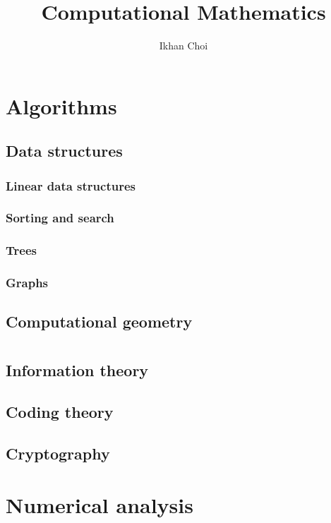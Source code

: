\documentclass{../../large}
\begin{document}
\title{Computational Mathematics}
\author{Ikhan Choi}
\maketitle
\tableofcontents
\part{Algorithms}
\chapter{Data structures}
\section{Linear data structures}
\section{Sorting and search}
\section{Trees}
\section{Graphs}
\chapter{Computational geometry}




\part{}
\chapter{Information theory}
\chapter{Coding theory}
\chapter{Cryptography}




\part{Numerical analysis}
\end{document}
